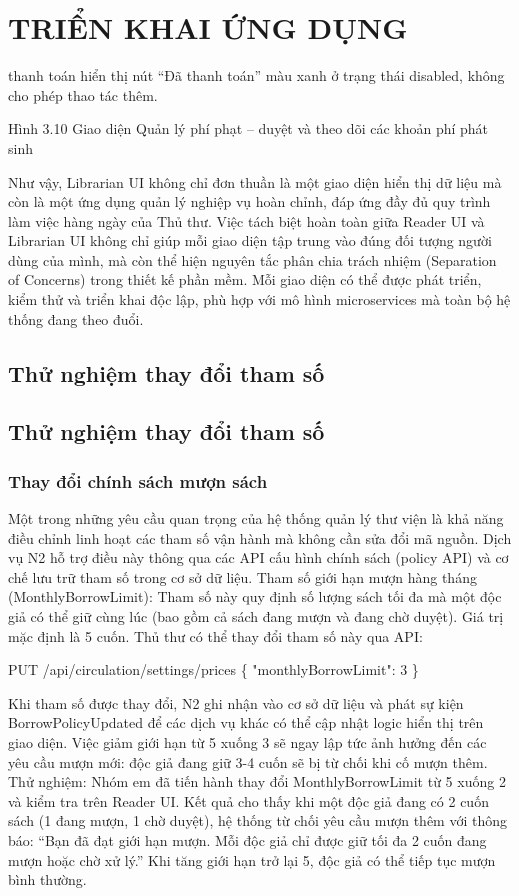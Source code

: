 \chapter{TRIỂN KHAI ỨNG DỤNG}

thanh toán hiển thị nút “Đã thanh toán” màu xanh ở trạng thái disabled, không cho phép thao tác thêm.

Hình 3.10 Giao diện Quản lý phí phạt – duyệt và theo dõi các khoản phí phát sinh

Như vậy, Librarian UI không chỉ đơn thuần là một giao diện hiển thị dữ liệu mà còn là một ứng dụng quản lý nghiệp vụ hoàn chỉnh, đáp ứng đầy đủ quy trình làm việc hàng ngày của Thủ thư. Việc tách biệt hoàn toàn giữa Reader UI và Librarian UI không chỉ giúp mỗi giao diện tập trung vào đúng đối tượng người dùng của mình, mà còn thể hiện nguyên tắc phân chia trách nhiệm (Separation of Concerns) trong thiết kế phần mềm. Mỗi giao diện có thể được phát triển, kiểm thử và triển khai độc lập, phù hợp với mô hình microservices mà toàn bộ hệ thống đang theo đuổi.

\section{Thử nghiệm thay đổi tham số}

\section{Thử nghiệm thay đổi tham số}

\subsection{Thay đổi chính sách mượn sách}

Một trong những yêu cầu quan trọng của hệ thống quản lý thư viện là khả năng điều chỉnh linh hoạt các tham số vận hành mà không cần sửa đổi mã nguồn. Dịch vụ N2 hỗ trợ điều này thông qua các API cấu hình chính sách (policy API) và cơ chế lưu trữ tham số trong cơ sở dữ liệu. Tham số giới hạn mượn hàng tháng (MonthlyBorrowLimit): Tham số này quy định số lượng sách tối đa mà một độc giả có thể giữ cùng lúc (bao gồm cả sách đang mượn và đang chờ duyệt). Giá trị mặc định là 5 cuốn. Thủ thư có thể thay đổi tham số này qua API:

PUT /api/circulation/settings/prices \{ "monthlyBorrowLimit": 3 \}

Khi tham số được thay đổi, N2 ghi nhận vào cơ sở dữ liệu và phát sự kiện BorrowPolicyUpdated để các dịch vụ khác có thể cập nhật logic hiển thị trên giao diện. Việc giảm giới hạn từ 5 xuống 3 sẽ ngay lập tức ảnh hưởng đến các yêu cầu mượn mới: độc giả đang giữ 3-4 cuốn sẽ bị từ chối khi cố mượn thêm. Thử nghiệm: Nhóm em đã tiến hành thay đổi MonthlyBorrowLimit từ 5 xuống 2 và kiểm tra trên Reader UI. Kết quả cho thấy khi một độc giả đang có 2 cuốn sách (1 đang mượn, 1 chờ duyệt), hệ thống từ chối yêu cầu mượn thêm với thông báo: “Bạn đã đạt giới hạn mượn. Mỗi độc giả chỉ được giữ tối đa 2 cuốn đang mượn hoặc chờ xử lý.” Khi tăng giới hạn trở lại 5, độc giả có thể tiếp tục mượn bình thường.

